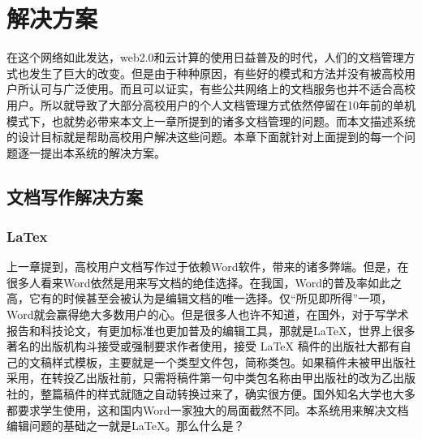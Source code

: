 
\chapter{解决方案}
\label{chap:contribute}

在这个网络如此发达，web2.0和云计算的使用日益普及的时代，人们的文档管理方式也发生了巨大的改变。但是由于种种原因，有些好的模式和方法并没有被高校用户所认可与广泛使用。而且可以证实，有些公共网络上的文档服务也并不适合高校用户。所以就导致了大部分高校用户的个人文档管理方式依然停留在10年前的单机模式下，也就势必带来本文上一章所提到的诸多文档管理的问题。而本文描述系统的设计目标就是帮助高校用户解决这些问题。本章下面就针对上面提到的每一个问题逐一提出本系统的解决方案。

\section{文档写作解决方案}
\label{sec:write}

\subsection{LaTex}
\label{sec:latex}

上一章提到，高校用户文档写作过于依赖Word软件，带来的诸多弊端。但是，在很多人看来Word依然是用来写文档的绝佳选择。在我国，Word的普及率如此之高，它有的时候甚至会被认为是编辑文档的唯一选择。仅“所见即所得”一项，Word就会赢得绝大多数用户的心。但是很多人也许不知道，在国外，对于写学术报告和科技论文，有更加标准也更加普及的编辑工具，那就是\LaTeX，世界上很多著名的出版机构斗接受或强制要求作者使用，接受 LaTeX 稿件的出版社大都有自己的文稿样式模板，主要就是一个类型文件包，简称类包。如果稿件未被甲出版社采用，在转投乙出版社前，只需将稿件第一句中类包名称由甲出版社的改为乙出版社的，整篇稿件的样式就随之自动转换过来了，确实很方便。国外知名大学也大多都要求学生使用，这和国内Word一家独大的局面截然不同。本系统用来解决文档编辑问题的基础之一就是\LaTeX。那么什么是？

